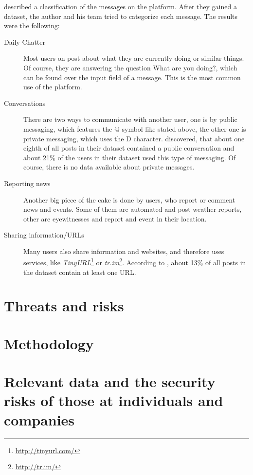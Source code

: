 \cite{java2007} described a classification of the messages on the \Twitter{}
platform. After they gained a dataset, the author and his team tried to
categorize each message. The results were the following:

\begin{description}

\item[Daily Chatter]
Most users on \Twitter{} post about what they are currently doing or similar
things. Of course, they are answering the question \flqq{}What are you
doing?\frqq{}, which can be found over the input field of a message. This is
the most common use of the \Twitter{} platform.

\item[Conversations]
There are two ways to communicate with another user, one is by public
messaging, which features the @ symbol like stated above, the other one is
private messaging, which uses the D character. \cite{java2007} discovered, that
about one eighth of all posts in their dataset contained a public conversation
and about 21\% of the users in their dataset used this type of messaging. Of
course, there is no data available about private messages.

\item[Reporting news]
Another big piece of the cake is done by users, who report or comment news and
events. Some of them are automated and post weather reports, other are
eyewitnesses and report and event in their location.

\item[Sharing information/URLs]
Many users also share information and websites, and therefore uses services,
like \textit{TinyURL}\footnote{\url{http://tinyurl.com/}} or
\textit{tr.im}\footnote{\url{http://tr.im/}}. According to \cite{java2007},
about 13\% of all posts in the dataset contain at least one URL.

\end{description}


\section{Threats and risks}

\section{Methodology}
\section{Relevant data and the security risks of those at individuals and companies}
